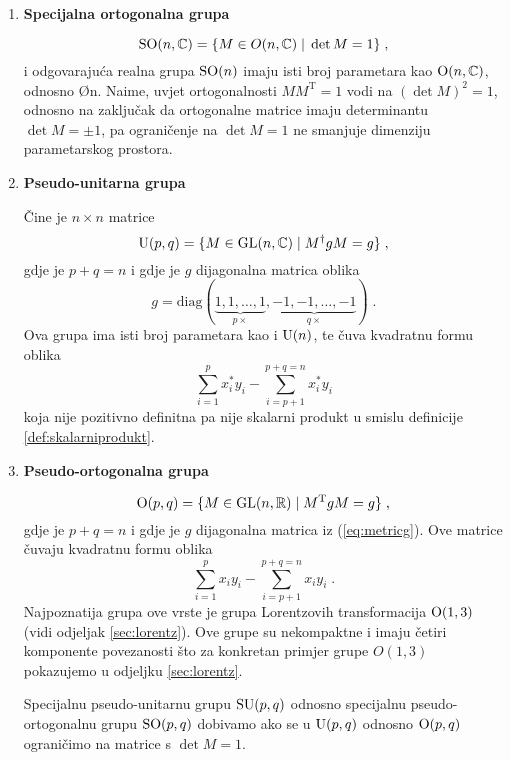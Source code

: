 \begin{enumerate}[leftmargin=0pt, itemindent=0pt]
\item \textbf{Specijalna ortogonalna grupa}

\begin{equation}
\mathrm{SO}(n, \mathbb{C}) = \{ M\in O(n, \mathbb{C}) \; | \; \det M  = 1\} \;,
\end{equation}
i odgovarajuća realna grupa $\mathrm{SO}(n)$ imaju isti broj parametara kao
$\mathrm{O}(n, \mathbb{C})$, odnosno \O{n}. Naime, uvjet ortogonalnosti
$M M^{\mathrm{T}} = 1$ vodi na $(\det M)^2 = 1$, odnosno
na zaključak da ortogonalne matrice imaju determinantu $\det M = \pm 1$,
pa ograničenje na $\det M = 1$ ne smanjuje dimenziju parametarskog prostora.

\item \textbf{Pseudo-unitarna grupa}

Čine je $n\times n$ matrice
\begin{equation}
\mathrm{U}(p, q) = \{ M\in \mathrm{GL}(n,\mathbb{C}) \; | \; M^{\dagger} g M = g\} \;,
\end{equation}
gdje je $p+q=n$ i gdje je $g$ dijagonalna matrica oblika
\begin{equation}
  g = \mathrm{diag}(\underbrace{1, 1, \dots, 1}_{p \times},
\underbrace{-1, -1, \dots, -1}_{q \times}) \;.
\label{eq:metricg}
\end{equation}
Ova grupa ima isti broj parametara kao i $\mathrm{U}(n)$, te
čuva kvadratnu formu oblika
\begin{equation}
 \sum_{i=1}^{p} x_{i}^* y_{i} - \sum_{i=p+1}^{p+q=n} x_{i}^* y_i 
\end{equation}
koja nije pozitivno definitna pa nije skalarni produkt u smislu
definicije \ref{def:skalarniprodukt}.


\item \textbf{Pseudo-ortogonalna grupa}

\begin{equation}
\mathrm{O}(p, q) = \{ M\in \mathrm{GL}(n,\mathbb{R}) \; | \; M^{\mathrm{T}} g M = g \} \;,
\label{eq:MgM}
\end{equation}
gdje je $p+q=n$ i gdje je $g$ dijagonalna matrica iz (\ref{eq:metricg}).
Ove matrice čuvaju kvadratnu formu oblika
\begin{equation}
 \sum_{i=1}^{p} x_{i} y_{i} - \sum_{i=p+1}^{p+q=n} x_{i} y_i  \;.
\end{equation}
Najpoznatija grupa ove vrste je grupa Lorentzovih transformacija  $\mathrm{O}(1,3)$
(vidi odjeljak \ref{sec:lorentz}). Ove grupe su nekompaktne i imaju
četiri komponente povezanosti što za 
konkretan primjer grupe $O(1,3)$ pokazujemo u odjeljku \ref{sec:lorentz}.

Specijalnu pseudo-unitarnu grupu $\mathrm{SU}(p,q)$ odnosno specijalnu
pseudo-or\-to\-go\-nal\-nu
grupu $\mathrm{SO}(p,q)$ dobivamo ako se u $\mathrm{U}(p,q)$ odnosno $\mathrm{O}(p, q)$
ograničimo na matrice s $\det M = 1$.

\end{enumerate}


